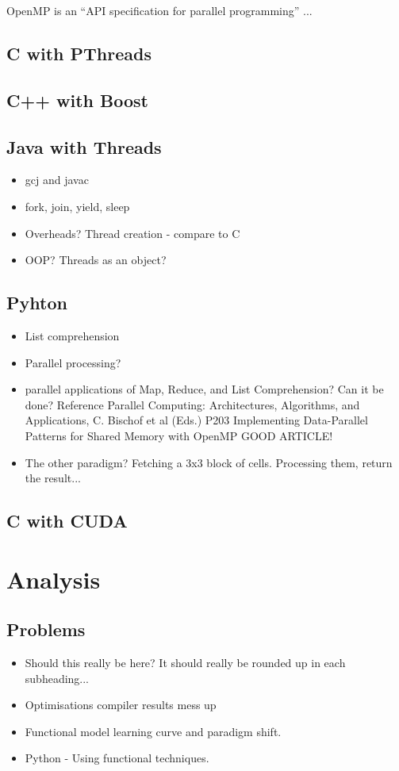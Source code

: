 \documentclass[11pt]{article} %
\begin{document}
\begin{itemize}
OpenMP is an ``API specification for parallel programming'' ... \cite{ref3}

\subsection{C with PThreads}
\subsection{C++ with Boost}
\subsection{Java with Threads}
\begin{itemize}
\item gcj and javac
\item fork, join, yield, sleep
\item Overheads? Thread creation - compare to C
\item OOP? Threads as an object?
\end{itemize}
\subsection{Pyhton}
\begin{itemize}
\item List comprehension
\item Parallel processing?
\item parallel applications of Map, Reduce, and List Comprehension? Can it be done? Reference Parallel Computing: Architectures, Algorithms, and Applications, C. Bischof et al (Eds.) P203 Implementing Data-Parallel Patterns for Shared Memory with OpenMP GOOD ARTICLE!
\item The other paradigm? Fetching a 3x3 block of cells. Processing them, return the result... 
\end{itemize}
\subsection{C with CUDA}
\section{Analysis}
\subsection{Problems}
\begin{itemize}
\item Should this really be here? It should really be rounded up in each subheading...
\item Optimisations compiler results mess up
\item Functional model learning curve and paradigm shift. 
\item Python - Using functional techniques.
\end{itemize}

\end{itemize}
\end{document}
